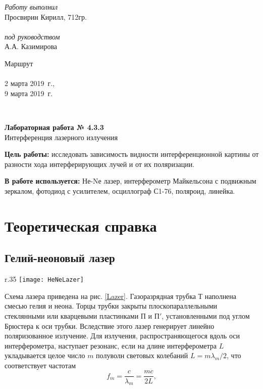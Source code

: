 \documentclass{MagicLabs}
\begin{document}
	
	
\begin{minipage}[l]{0.3\textwidth}
	\textit{Работу выполнил}\\
	Просвирин Кирилл, 712гр.\\\\
	\textit{под руководством}\\
	А.А. Казимирова
\end{minipage}
\hfill
\begin{minipage}[l]{0.21\textwidth}
	Маршрут  \\\\
	2 марта 2019~г.,\\
	9 марта 2019~г.\\
\end{minipage}
\\[20pt]
\begin{center}
	\LARGE{\textbf{Лабораторная работа № 4.3.3}\\
		Интерференция лазерного излучения\\[20pt]}
\end{center}



\textbf{Цель работы: }исследовать зависимость видности интерференционной картины от разности хода интерферирующих лучей и от их поляризации.

\textbf{В работе используется: }Не-Nе лазер, интерферометр Майкельсона с подвижным зеркалом, фотодиод с усилителем, осциллограф С1-76, поляроид, линейка.


\section{Теоретическая справка}

\subsection*{Гелий-неоновый лазер}

\begin{wrapfigure}[6]{r}{.35\textwidth}\centering
	\vspace{-3ex}
	\texttt{[image: HeNeLazer]}
	\caption{Схема лазера}
	\label{Lazer}
\end{wrapfigure}

Схема лазера приведена на рис. \ref{Lazer}. Газоразрядная трубка Т наполнена
смесью гелия и неона. Торцы трубки  закрыты плоскопараллельными стеклянными или
кварцевыми пластинками $ П $ и $ П' $, установленными под углом Брюстера к оси трубки.
Вследствие этого лазер генерирует 
линейно поляризованное излучение. Для излучения, распространяющегося вдоль оси
интерферометра, наступает резонанс, если на длине интерферометра $ L $ 
укладывается целое число $ m $ полуволн световых колебаний $ L = m\lambda_m/2 $, 
что соответствует частотам
\begin{equation}\label{frequency}
	f_m=\dfrac{c}{\lambda_m}=\dfrac{mc}{2L},
\end{equation}
 
\end{document}
